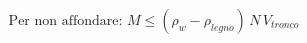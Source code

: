 \documentclass[preview]{standalone}
\begin{document}
\begin{align*}
\text{Per non affondare: } M \le (\rho_w-\rho_{legno})\, N\, V_{tronco}
\end{align*}
\end{document}
